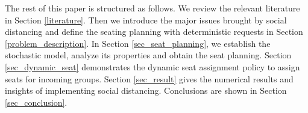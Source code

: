 The rest of this paper is structured as follows. We review the relevant literature in Section \ref{literature}. Then we introduce the major issues brought by social distancing and define the seating planning with deterministic requests in Section \ref{problem_description}. In Section \ref{sec_seat_planning}, we establish the stochastic model, analyze its properties and obtain the seat planning. Section \ref{sec_dynamic_seat} demonstrates the dynamic seat assignment policy to assign seats for incoming groups. Section \ref{sec_result} gives the numerical results and insights of implementing social distancing. Conclusions are shown in Section \ref{sec_conclusion}.
\newpage
